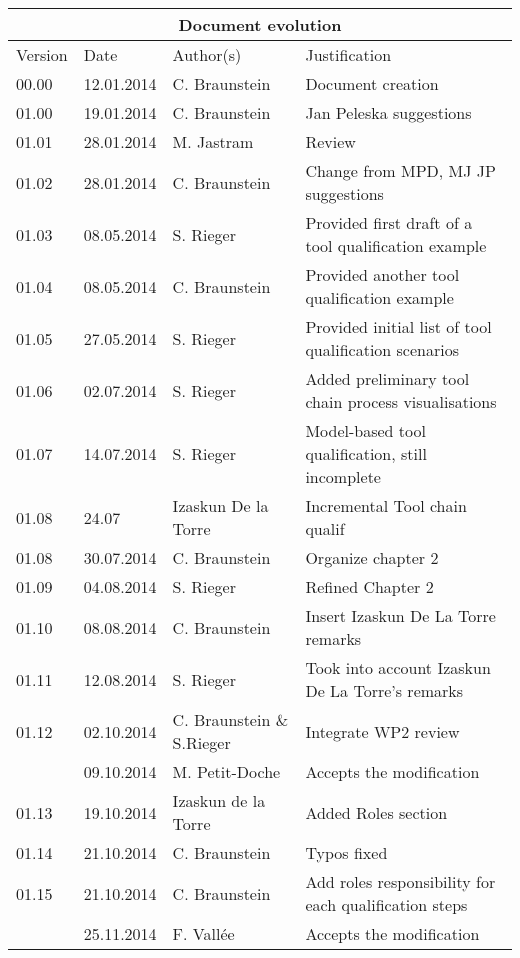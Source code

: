 \documentclass{template/openetcs_report}
\begin{document}
\begin{tabular}{|p{2.2cm}|p{2cm}|p{3cm}|p{5cm}|}
\hline
\multicolumn{4}{|c|}{Document evolution} \\
\hline
Version &  Date & Author(s) & Justification  \\
\hline  
00.00 & 12.01.2014 & C. Braunstein  &  Document creation  \\
01.00 & 19.01.2014 & C. Braunstein  &  Jan Peleska suggestions \\
01.01 & 28.01.2014 & M. Jastram  &  Review \\
01.02 & 28.01.2014 &  C. Braunstein &  Change from MPD, MJ JP suggestions \\
01.03 & 08.05.2014 &  S. Rieger &  Provided first draft of a tool qualification example \\
01.04 & 08.05.2014 &  C. Braunstein  &  Provided  another  tool qualification example \\
01.05 & 27.05.2014 &  S. Rieger &  Provided initial list of tool qualification scenarios\\
01.06 & 02.07.2014 &  S. Rieger &  Added preliminary tool chain process visualisations\\
01.07 & 14.07.2014 &  S. Rieger &  Model-based tool qualification,
still incomplete\\
01.08 & 24.07 & Izaskun De la Torre & Incremental Tool chain qualif \\
01.08 & 30.07.2014 & C. Braunstein & Organize chapter 2 \\
01.09 & 04.08.2014 & S. Rieger & Refined Chapter 2 \\
01.10 & 08.08.2014 & C. Braunstein & Insert Izaskun De La Torre
remarks\\
01.11 & 12.08.2014 & S. Rieger & Took into account Izaskun De La
Torre's remarks\\
01.12 & 02.10.2014 & C. Braunstein \& S.Rieger & Integrate WP2
review\\
   &  09.10.2014 & M. Petit-Doche & Accepts the modification \\
01.13 & 19.10.2014 & Izaskun de la Torre & Added Roles section\\
01.14 & 21.10.2014 & C. Braunstein & Typos fixed\\
01.15 & 21.10.2014 & C. Braunstein & Add roles responsibility for each
qualification steps\\
   & 25.11.2014 & F. Vallée & Accepts the modification \\
\hline  
\end{tabular}
\newpage
\end{document}
